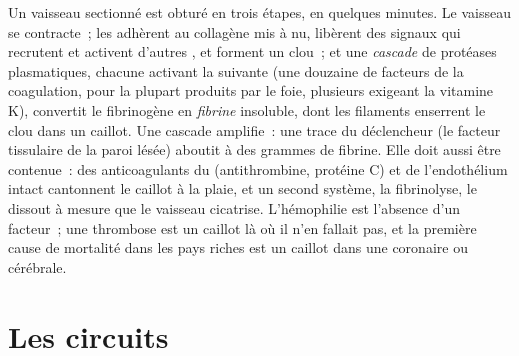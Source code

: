 \begin{proposition}[L'hémostase]\label{prop:b2:blood-circulation:clotting}
Un vaisseau sectionné est obturé en trois étapes, en quelques minutes.
Le vaisseau se contracte~; les  adhèrent au collagène mis à
nu, libèrent des signaux qui recrutent et activent d'autres ,
et forment un clou~; et une \emph{cascade} de protéases plasmatiques,
chacune activant la suivante (une douzaine de facteurs de la
coagulation, pour la plupart produits par le foie, plusieurs exigeant
la vitamine K), convertit le fibrinogène en \emph{fibrine} insoluble,
dont les filaments enserrent le clou dans un caillot. Une cascade
amplifie~: une trace du déclencheur (le facteur tissulaire de la paroi
lésée) aboutit à des grammes de fibrine. Elle doit aussi être
contenue~: des anticoagulants du  (antithrombine, protéine C) et
de l'endothélium intact cantonnent le caillot à la plaie, et un second
système, la fibrinolyse, le dissout à mesure que le vaisseau cicatrise.
L'hémophilie est l'absence d'un facteur~; une thrombose est un caillot
là où il n'en fallait pas, et la première cause de mortalité dans les
pays riches est un caillot dans une  coronaire ou cérébrale.
\end{proposition}

\section{Les circuits}

